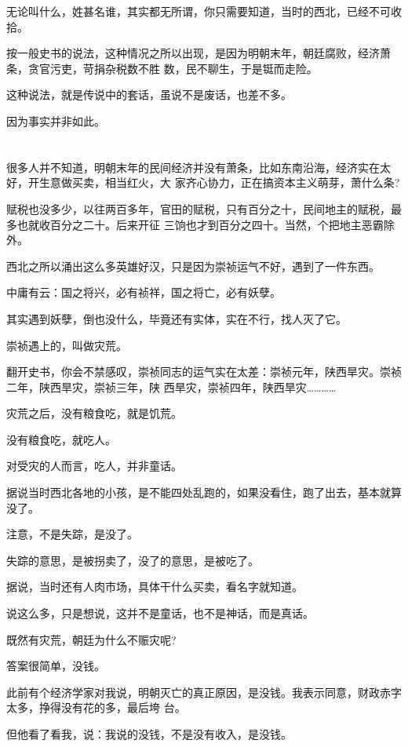 \documentclass[11pt,a4paper,onecolumn]{article}
\begin{document}
无论叫什么，姓甚名谁，其实都无所谓，你只需要知道，当时的西北，已经不可收拾。

按一般史书的说法，这种情况之所以出现，是因为明朝末年，朝廷腐败，经济萧条，贪官污吏，苛捐杂税数不胜
数，民不聊生，于是铤而走险。

这种说法，就是传说中的套话，虽说不是废话，也差不多。

因为事实并非如此。

\section[\thesection]{}

很多人并不知道，明朝末年的民间经济并没有萧条，比如东南沿海，经济实在太好，开生意做买卖，相当红火，大
家齐心协力，正在搞资本主义萌芽，萧什么条?

赋税也没多少，以往两百多年，官田的赋税，只有百分之十，民间地主的赋税，最多也就收百分之二十。后来开征
三饷也才到百分之四十。当然，个把地主恶霸除外。

西北之所以涌出这么多英雄好汉，只是因为崇祯运气不好，遇到了一件东西。

中庸有云：国之将兴，必有祯祥，国之将亡，必有妖孽。

其实遇到妖孽，倒也没什么，毕竟还有实体，实在不行，找人灭了它。

崇祯遇上的，叫做灾荒。

翻开史书，你会不禁感叹，崇祯同志的运气实在太差：崇祯元年，陕西旱灾。崇祯二年，陕西旱灾，崇祯三年，陕
西旱灾，崇祯四年，陕西旱灾…………

灾荒之后，没有粮食吃，就是饥荒。

没有粮食吃，就吃人。

对受灾的人而言，吃人，并非童话。

据说当时西北各地的小孩，是不能四处乱跑的，如果没看住，跑了出去，基本就算没了。

注意，不是失踪，是没了。

失踪的意思，是被拐卖了，没了的意思，是被吃了。

据说，当时还有人肉市场，具体干什么买卖，看名字就知道。

说这么多，只是想说，这并不是童话，也不是神话，而是真话。

既然有灾荒，朝廷为什么不赈灾呢?

答案很简单，没钱。

此前有个经济学家对我说，明朝灭亡的真正原因，是没钱。我表示同意，财政赤字太多，挣得没有花的多，最后垮
台。

但他看了看我，说：我说的没钱，不是没有收入，是没钱。
\end{document}
